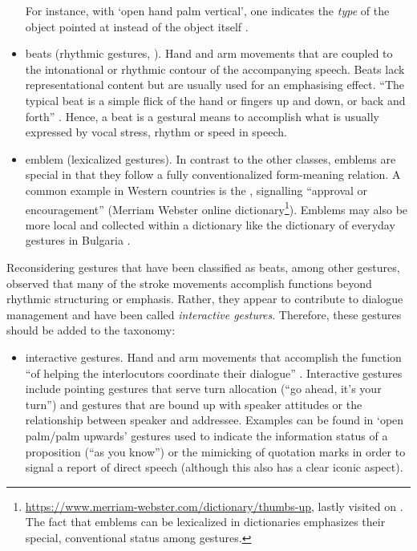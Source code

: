 \documentclass[output=paper
 	        ,biblatex
                ,babelshorthands
                ,newtxmath
                ,draftmode
                ,colorlinks, citecolor=brown
]{langscibook}
\begin{document}
\begin{itemize}
%
For instance, with \enquote*{open hand palm vertical}, one indicates the \emph{type} of the object pointed at instead of the object itself \citep[]{Kendon:Versante:2003}.
\item beats (rhythmic gestures, ). Hand and arm movements that are coupled to the intonational or rhythmic contour of the accompanying speech. Beats lack representational content but are usually used for an emphasising effect. \enquote{The typical beat is a simple flick of the hand or fingers up and down, or back and forth} \citep[]{McNeill:1992}. Hence, a beat is a gestural means to accomplish what is usually expressed by vocal stress, rhythm or speed in speech. 
\item emblem (lexicalized gestures). In contrast to the other classes, emblems are special in that they follow a fully conventionalized form-meaning relation. A common example in Western countries is the , signalling \enquote{approval or encouragement} (Merriam Webster online dictionary\footnote{\url{https://www.merriam-webster.com/dictionary/thumbs-up}, lastly visited on . The fact that emblems can be lexicalized in dictionaries emphasizes their special, conventional status among gestures.}). Emblems may also be more local and collected within a dictionary like the dictionary of everyday gestures in Bulgaria \citep{Kolarova:2011}.
\end{itemize}


Reconsidering gestures that have been classified as beats, among other gestures, \citet{Bavelas:Chovil:Lawrie:Wade:1992} observed that many of the stroke movements accomplish functions beyond rhythmic structuring or emphasis.
%
Rather, they appear to contribute to dialogue management and have been called \emph{interactive gestures}.
%
Therefore, these gestures should be added to the taxonomy:

\begin{itemize}
\item interactive gestures. Hand and arm movements that accomplish the function \enquote{of helping the interlocutors coordinate their dialogue} \citep[]{Bavelas:Chovil:Coates:Roe:1995}. Interactive gestures include pointing gestures that serve turn allocation (\enquote{go ahead, it's your turn}) and gestures that are bound up with speaker attitudes or the relationship between speaker and addressee. Examples can be found in \enquote*{open palm/palm upwards} gestures used to indicate the information status of a proposition (\enquote{as you know}) or the mimicking of quotation marks in order to signal a report of direct speech (although this also has a clear iconic aspect).
\end{itemize}
\end{document}
